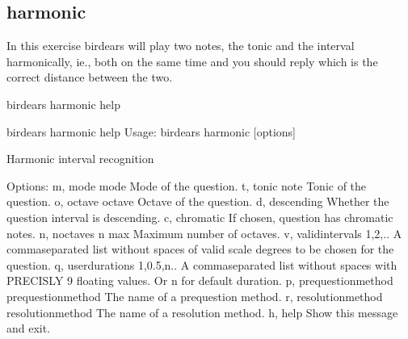 \documentclass[letterpaper,10pt,english]{sphinxmanual}
\begin{document}
\subsection{harmonic}
\label{\detokenize{index:harmonic}}
In this exercise birdears will play two notes, the tonic and the interval
harmonically, ie., both on the same time and you should reply which is the
correct distance between the two.

\begin{sphinxVerbatim}[commandchars=\\\{\}]
birdears harmonic \PYGZhy{}\PYGZhy{}help
\end{sphinxVerbatim}

\begin{sphinxVerbatim}[commandchars=\\\{\}]
\PYGZdl{} birdears harmonic \PYGZhy{}\PYGZhy{}help
Usage: birdears harmonic [options]

  Harmonic interval recognition

Options:
  \PYGZhy{}m, \PYGZhy{}\PYGZhy{}mode \PYGZlt{}mode\PYGZgt{}               Mode of the question.
  \PYGZhy{}t, \PYGZhy{}\PYGZhy{}tonic \PYGZlt{}note\PYGZgt{}              Tonic of the question.
  \PYGZhy{}o, \PYGZhy{}\PYGZhy{}octave \PYGZlt{}octave\PYGZgt{}           Octave of the question.
  \PYGZhy{}d, \PYGZhy{}\PYGZhy{}descending                Whether the question interval is descending.
  \PYGZhy{}c, \PYGZhy{}\PYGZhy{}chromatic                 If chosen, question has chromatic notes.
  \PYGZhy{}n, \PYGZhy{}\PYGZhy{}n\PYGZus{}octaves \PYGZlt{}n max\PYGZgt{}         Maximum number of octaves.
  \PYGZhy{}v, \PYGZhy{}\PYGZhy{}valid\PYGZus{}intervals \PYGZlt{}1,2,..\PYGZgt{}  A comma\PYGZhy{}separated list without spaces
                                  of valid scale degrees to be chosen for the
                                  question.
  \PYGZhy{}q, \PYGZhy{}\PYGZhy{}user\PYGZus{}durations \PYGZlt{}1,0.5,n..\PYGZgt{}
                                  A comma\PYGZhy{}separated list without
                                  spaces with PRECISLY 9 floating values. Or
                                  \PYGZsq{}n\PYGZsq{} for default              duration.
  \PYGZhy{}p, \PYGZhy{}\PYGZhy{}prequestion\PYGZus{}method \PYGZlt{}prequestion\PYGZus{}method\PYGZgt{}
                                  The name of a pre\PYGZhy{}question method.
  \PYGZhy{}r, \PYGZhy{}\PYGZhy{}resolution\PYGZus{}method \PYGZlt{}resolution\PYGZus{}method\PYGZgt{}
                                  The name of a resolution method.
  \PYGZhy{}h, \PYGZhy{}\PYGZhy{}help                      Show this message and exit.


\end{sphinxVerbatim}
\end{document}
